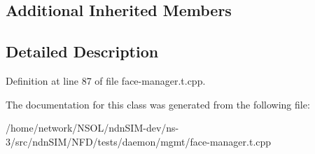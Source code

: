 \subsection*{Additional Inherited Members}


\subsection{Detailed Description}


Definition at line 87 of file face-\/manager.\+t.\+cpp.



The documentation for this class was generated from the following file\+:\begin{DoxyCompactItemize}
\item 
/home/network/\+N\+S\+O\+L/ndn\+S\+I\+M-\/dev/ns-\/3/src/ndn\+S\+I\+M/\+N\+F\+D/tests/daemon/mgmt/face-\/manager.\+t.\+cpp\end{DoxyCompactItemize}

